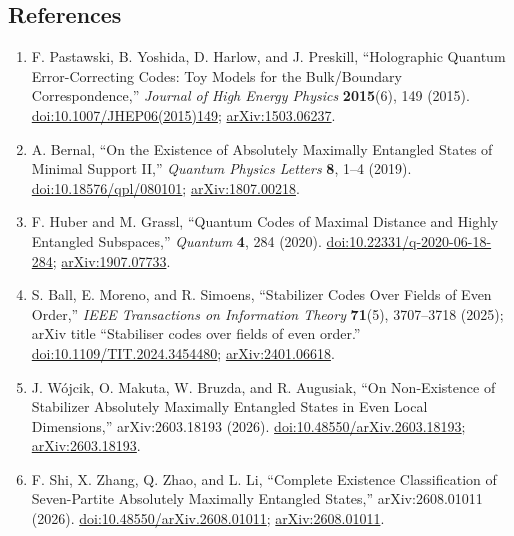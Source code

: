 \subsection*{References}

\begin{enumerate}[label={},leftmargin=4.8em,labelsep=0.5em]
  \footnotesize
  \item[\textup{[PYHP15]}]\label{ref:p40-pastawski}
  F. Pastawski, B. Yoshida, D. Harlow, and J. Preskill,
  ``Holographic Quantum Error-Correcting Codes: Toy Models for the
  Bulk/Boundary Correspondence,'' \emph{Journal of High Energy Physics}
  \textbf{2015}(6), 149 (2015).
  \href{https://doi.org/10.1007/JHEP06(2015)149}{doi:10.1007/JHEP06(2015)149};
  \href{https://arxiv.org/abs/1503.06237}{arXiv:1503.06237}.

  \item[\textup{[Ber19]}]\label{ref:p40-bernal}
  A. Bernal,
  ``On the Existence of Absolutely Maximally Entangled States of Minimal
  Support II,'' \emph{Quantum Physics Letters} \textbf{8}, 1--4 (2019).
  \href{https://doi.org/10.18576/qpl/080101}{doi:10.18576/qpl/080101};
  \href{https://arxiv.org/abs/1807.00218}{arXiv:1807.00218}.

  \item[\textup{[HG20]}]\label{ref:p40-huber-grassl}
  F. Huber and M. Grassl,
  ``Quantum Codes of Maximal Distance and Highly Entangled Subspaces,''
  \emph{Quantum} \textbf{4}, 284 (2020).
  \href{https://doi.org/10.22331/q-2020-06-18-284}{doi:10.22331/q-2020-06-18-284};
  \href{https://arxiv.org/abs/1907.07733}{arXiv:1907.07733}.

  \item[\textup{[BMS25]}]\label{ref:p40-ball}
  S. Ball, E. Moreno, and R. Simoens,
  ``Stabilizer Codes Over Fields of Even Order,'' \emph{IEEE Transactions on
  Information Theory} \textbf{71}(5), 3707--3718 (2025); arXiv title
  ``Stabiliser codes over fields of even order.''
  \href{https://doi.org/10.1109/TIT.2024.3454480}{doi:10.1109/TIT.2024.3454480};
  \href{https://arxiv.org/abs/2401.06618}{arXiv:2401.06618}.

  \item[\textup{[WMB+26]}]\label{ref:p40-wojcik}
  J. W\'ojcik, O. Makuta, W. Bruzda, and R. Augusiak,
  ``On Non-Existence of Stabilizer Absolutely Maximally Entangled States in
  Even Local Dimensions,'' arXiv:2603.18193 (2026).
  \href{https://doi.org/10.48550/arXiv.2603.18193}{doi:10.48550/arXiv.2603.18193};
  \href{https://arxiv.org/abs/2603.18193}{arXiv:2603.18193}.

  \item[\textup{[SZZL26]}]\label{ref:p40-shi}
  F. Shi, X. Zhang, Q. Zhao, and L. Li,
  ``Complete Existence Classification of Seven-Partite Absolutely Maximally
  Entangled States,'' arXiv:2608.01011 (2026).
  \href{https://doi.org/10.48550/arXiv.2608.01011}{doi:10.48550/arXiv.2608.01011};
  \href{https://arxiv.org/abs/2608.01011}{arXiv:2608.01011}.
\end{enumerate}

